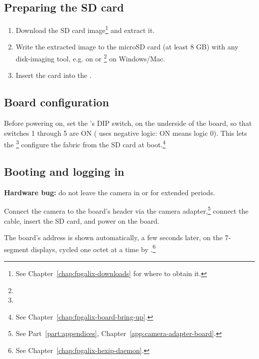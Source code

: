 \subsection{Preparing the SD card}

\begin{enumerate}
    \item Download the SD card image\footnote{See Chapter~\ref{chap:fpgalix-downloads} for where to obtain it.} and extract it.
    \item Write the extracted image to the microSD card (at least 8 GB) with any disk-imaging tool, e.g.  on  or \footnote{} on Windows/Mac.
    \item Insert the card into the .
\end{enumerate}

\subsection{Board configuration}

Before powering on, set the 's  DIP switch, on the underside of the board, so that switches 1 through 5 are ON ( uses negative logic: ON means logic 0). This lets the \footnote{} configure the  fabric from the SD card at boot.\footnote{See Chapter~\ref{chap:fpgalix-board-bring-up}.}

\subsection{Booting and logging in}

\begin{warningbox}
\textbf{Hardware bug:} do not leave the camera in  or  for extended periods.\footnotemark
\end{warningbox}

Connect the  camera to the  board's  header via the camera adapter,\footnote{See Part~\ref{part:appendices}, Chapter~\ref{app:camera-adapter-board}.} connect the  cable, insert the SD card, and power on the board.

The board's  address is shown automatically, a few seconds later, on the 7-segment displays, cycled one octet at a time by .\footnote{See Chapter~\ref{chap:fpgalix-hexip-daemon}.}

